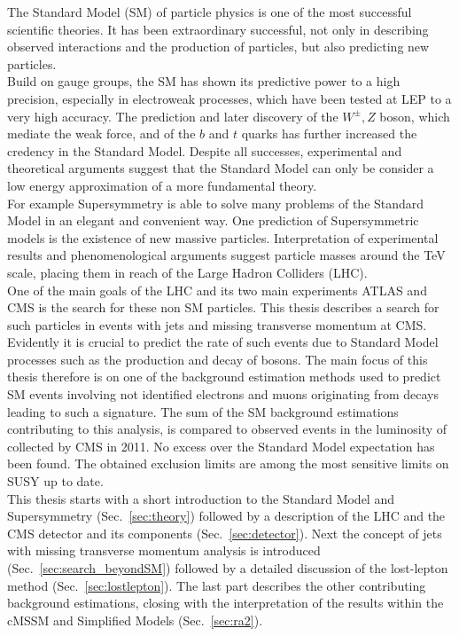 The Standard Model (SM) of particle physics is one of the most successful scientific theories. It has been extraordinary successful, not only in describing observed interactions and the production of particles, but also predicting new particles.\\
Build on gauge groups, the SM has shown its predictive power to a high precision, especially in electroweak processes, which have been tested at LEP to a very high accuracy.
The prediction and later discovery of the $W^{\pm},Z$ boson, which mediate the weak force, and of the $b$ and $t$ quarks has further increased the credency in the Standard Model. Despite all successes, experimental and theoretical arguments suggest that the Standard Model can only be consider a low energy approximation of a more fundamental theory.\\
For example Supersymmetry is able to solve many problems of the Standard Model in an elegant and convenient way. One prediction of Supersymmetric models is the existence of new massive particles. Interpretation of experimental results and phenomenological arguments suggest particle masses around the TeV scale, placing them in reach of the Large Hadron Colliders (LHC).\\
One of the main goals of the LHC and its two main experiments ATLAS and CMS is the search for these non SM particles. This thesis describes a search for such particles in events with jets and missing transverse momentum at CMS. Evidently it is crucial to predict the rate of such events due to Standard Model processes such as the production and decay of \W bosons.
The main focus of this thesis therefore is on one of the background estimation methods used to predict SM events involving not identified electrons and muons originating from \W decays leading to such a signature. The sum of the SM background estimations contributing to this analysis, is compared to observed events in the luminosity of \lumi collected by CMS in 2011. No excess over the Standard Model expectation has been found. The obtained exclusion limits are among the most sensitive limits on SUSY up to date.\\
This thesis starts with a short introduction to the Standard Model and Supersymmetry (Sec.~\ref{sec:theory}) followed by a description of the LHC and the CMS detector and its components (Sec.~\ref{sec:detector}). Next the concept of jets with missing transverse momentum analysis is introduced (Sec.~\ref{sec:search_beyondSM}) followed by a detailed discussion of the lost-lepton method (Sec.~\ref{sec:lostlepton}). The last part describes the other contributing background estimations, closing with the interpretation of the results within the cMSSM and Simplified Models (Sec.~\ref{sec:ra2}).
